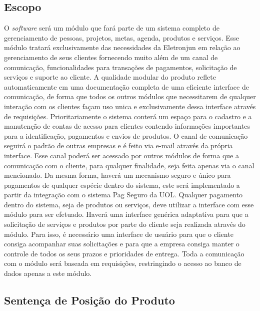     \subsection{Escopo}
      O \textit{software} será um módulo que fará parte de um sistema completo de gerenciamento de pessoas, projetos, metas, agenda, produtos e serviços. Esse módulo tratará exclusivamente das necessidades da Eletronjun em relação ao gerenciamento de seus clientes fornecendo muito além de um canal de comunicação, funcionalidades para transações de pagamentos, solicitação de serviços e suporte ao cliente.
      A qualidade modular do produto reflete automaticamente em uma documentação completa de uma eficiente interface de comunicação, de forma que todos os outros módulos que necessitarem de qualquer interação com os clientes façam uso unica e exclusivamente dessa interface através de requisições.
      Prioritariamente o sistema conterá um espaço para o cadastro e a manutenção de contas de acesso para clientes contendo informações importantes para a identificação, pagamentos e envios de produtos.
      O canal de comunicação seguirá o padrão de outras empresas e é feito via e-mail através da própria interface. Esse canal poderá ser acessado por outros módulos de forma que a comunicação com o cliente, para qualquer finalidade, seja feita apenas via o canal mencionado. Da mesma forma, haverá um mecanismo seguro e único para pagamentos de qualquer espécie dentro do sistema, este será implementado a partir da integração com o sistema Pag Seguro da UOL. Qualquer pagamento dentro do sistema, seja de produtos ou serviços, deve utilizar a interface com esse módulo para ser efetuado.
      Haverá uma interface genérica adaptativa para que a solicitação de serviços e produtos por parte do cliente seja realizada através do módulo. Para isso, é necessário uma interface de usuário para que o cliente consiga acompanhar suas solicitações e para que a empresa consiga manter o controle de todos os seus prazos e prioridades de entrega.
      Toda a comunicação com o módulo será baseada em requisições, restringindo o acesso ao banco de dados apenas a este módulo. 



    \subsection{Sentença de Posição do Produto} 

